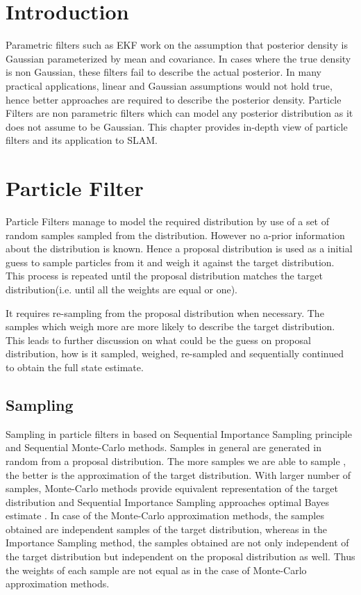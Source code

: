 \section*{Introduction}
Parametric filters such as EKF work on the assumption that posterior density is Gaussian parameterized by mean and covariance. In cases where the true density is non Gaussian, these filters fail to describe the actual posterior. In many practical applications, linear and Gaussian assumptions would not hold true, hence better approaches are required to describe the posterior density. Particle Filters are non parametric filters which can model any posterior distribution as it does not assume to be Gaussian. This chapter provides in-depth view of particle filters and its application to SLAM.
\section{Particle Filter}
Particle Filters manage to model the required distribution by use of a set of random samples sampled from the distribution. However no a-prior information about the distribution is known. Hence a proposal distribution is used as a initial guess to sample particles from it and weigh it against the target distribution. This process is repeated until the proposal distribution matches the target distribution(i.e. until all the weights are equal or one).
\par
It requires re-sampling from the proposal distribution when necessary. The samples which weigh more are more likely to describe the target distribution. This leads to further discussion on what could be the guess on proposal distribution, how is it sampled, weighed, re-sampled and sequentially continued to obtain the full state estimate.

\subsection{Sampling}
Sampling in particle filters in based on Sequential Importance Sampling principle and Sequential Monte-Carlo methods. Samples in general are generated in random from a proposal distribution. The more samples we are able to sample , the better is the approximation of the target distribution. With larger number of samples, Monte-Carlo methods provide equivalent representation of the target distribution and Sequential Importance Sampling approaches optimal Bayes estimate \cite{S.Arulampalam}. In case of the Monte-Carlo approximation methods, the samples obtained are independent samples of the target distribution, whereas in the Importance Sampling method, the samples obtained are not only independent of the target distribution but independent on the proposal distribution as well. Thus the weights of each sample are not equal as in the case of Monte-Carlo approximation methods.

